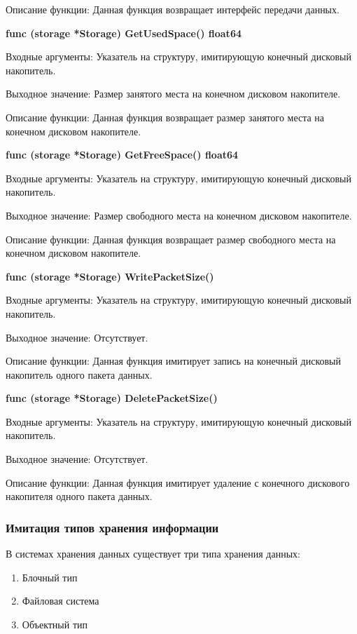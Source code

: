 Описание функции: Данная функция возвращает интерфейс передачи данных.

\textbf{func (storage *Storage) GetUsedSpace() float64 }

Входные аргументы: Указатель на структуру, имитирующую конечный дисковый накопитель.

Выходное значение:  Размер занятого места на конечном дисковом накопителе.

Описание функции: Данная функция возвращает размер занятого места на конечном дисковом накопителе.

\textbf{func (storage *Storage) GetFreeSpace() float64}

Входные аргументы: Указатель на структуру, имитирующую конечный дисковый накопитель.

Выходное значение: Размер свободного места на конечном дисковом накопителе.

Описание функции: Данная функция возвращает размер свободного места на конечном дисковом накопителе.

\textbf{func (storage *Storage) WritePacketSize() }

Входные аргументы: Указатель на структуру, имитирующую конечный дисковый накопитель.

Выходное значение: Отсутствует.

Описание функции: Данная функция имитирует запись на конечный дисковый накопитель одного пакета данных.

\textbf{func (storage *Storage) DeletePacketSize()}

Входные аргументы: Указатель на структуру, имитирующую конечный дисковый накопитель.

Выходное значение: Отсутствует.

Описание функции: Данная функция имитирует удаление с конечного дискового накопителя одного пакета данных.

\subsubsection{Имитация типов хранения информации}
В системах хранения данных существует три типа хранения данных:
\begin{enumerate}
\item Блочный тип 
\item Файловая система 
\item Объектный тип
\end{enumerate}

